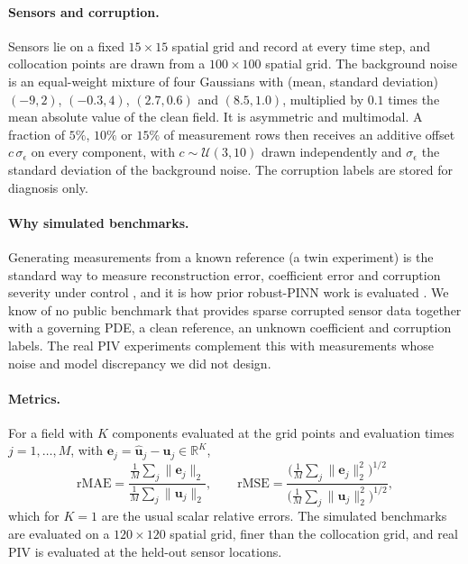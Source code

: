 \documentclass[twoside]{article}
\begin{document}
\paragraph{Sensors and corruption.}
Sensors lie on a fixed $15 \times 15$ spatial grid and record at every time
step, and collocation points are drawn from a $100 \times 100$ spatial grid. The
background noise is an equal-weight mixture of four Gaussians with (mean,
standard deviation) $(-9, 2)$, $(-0.3, 4)$, $(2.7, 0.6)$ and $(8.5, 1.0)$,
multiplied by $0.1$ times the mean absolute value of the clean field. It is
asymmetric and multimodal. A fraction of $5\%$, $10\%$ or $15\%$ of measurement
rows then receives an additive offset $c\,\sigma_\epsilon$ on every component,
with $c \sim \mathcal{U}(3,10)$ drawn independently and $\sigma_\epsilon$ the
standard deviation of the background noise. The corruption labels are stored
for diagnosis only.

\paragraph{Why simulated benchmarks.}
Generating measurements from a known reference (a twin experiment) is the
standard way to measure reconstruction error, coefficient error and corruption
severity under control \citep{Asch2016}, and it is how prior robust-PINN work
is evaluated \citep{Yang2021, Peng2022, Duarte2025}. We know of no public
benchmark that provides sparse corrupted sensor data together with a governing
PDE, a clean reference, an unknown coefficient and corruption labels. The real
PIV experiments complement this with measurements whose noise and model
discrepancy we did not design.

\paragraph{Metrics.}
For a field with $K$ components evaluated at the grid points and evaluation
times $j = 1,\dots,M$, with $\mathbf{e}_j = \hat{\mathbf{u}}_j - \mathbf{u}_j \in
\mathbb{R}^K$,
\begin{equation*}
\mathrm{rMAE} = \frac{\frac{1}{M}\sum_j \|\mathbf{e}_j\|_2}{\frac{1}{M}\sum_j
\|\mathbf{u}_j\|_2}, \qquad
\mathrm{rMSE} = \frac{\big(\frac{1}{M}\sum_j \|\mathbf{e}_j\|_2^2\big)^{1/2}}
{\big(\frac{1}{M}\sum_j \|\mathbf{u}_j\|_2^2\big)^{1/2}},
\end{equation*}
which for $K = 1$ are the usual scalar relative errors. The
simulated benchmarks are evaluated on a $120 \times 120$ spatial grid, finer
than the collocation grid, and real PIV is evaluated at the held-out sensor
locations.
\end{document}
